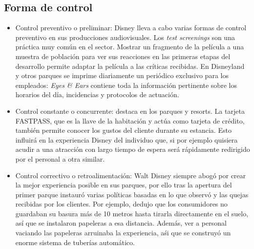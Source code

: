 \subsection{Forma de control}
\begin{itemize}
\item Control preventivo o preliminar: Disney lleva a cabo varias formas de control preventivo en sus producciones audiovisuales. Los \textit{test screenings} son una práctica muy común en el sector. Mostrar un fragmento de la película a una muestra de población para ver sus reacciones en las primeras etapas del desarrollo permite adaptar la película a las críticas recibidas. 
En Disneyland y otros parques se imprime diariamente un periódico exclusivo para los empleados: \textit{Eyes \& Ears} contiene toda la información pertinente sobre los horarios del día, incidencias y protocolos de actuación.

\item Control constante o concurrente: destaca en los parques y resorts. La tarjeta FASTPASS, que es la llave de la habitación y actúa como tarjeta de crédito, también permite conocer los gustos del cliente durante su estancia. Esto influirá en la experiencia Disney del individuo que, si por ejemplo quisiera acudir a una atracción con largo tiempo de espera será rápidamente redirigido por el personal a otra similar. 

\item Control correctivo o retroalimentación: Walt Disney siempre abogó por crear la mejor experiencia posible en sus parques, por ello tras la apertura del primer parque instauró varias políticas basadas en lo que observó y las quejas recibidas por los clientes. Por ejemplo, dedujo que los consumidores no guardaban su basura más de 10 metros hasta tirarla directamente en el suelo, así que se instalaron papeleras a esa distancia. Además, ver a personal vaciando las papeleras arruinaba la experiencia, aśi que se construyó un enorme sistema de tuberías automático. 

\end{itemize}